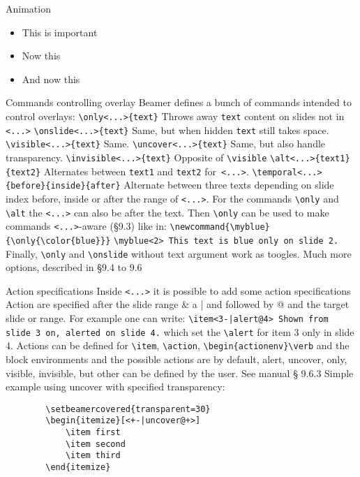 \documentclass[aspectratio=169]{beamer}
\begin{document}
	\begin{frame}{Animation}
		\begin{itemize}[<+- | alert@+>]
			\item \alert<4>{This is important}
			\item Now this
			\item And now this
		\end{itemize}
	\end{frame}

	\begin{frame}[fragile]{Commands controlling overlay}
		Beamer defines a bunch of commands intended to control overlays:
		\verb$\only<...>{text}$ Throws away \verb$text$ content on slides not in \verb$<...>$
		\verb$\onslide<...>{text}$ Same, but when hidden \verb$text$ still takes space.
		\verb$\visible<...>{text}$ Same.
		\verb$\uncover<...>{text}$ Same, but also handle transparency.
		\verb$\invisible<...>{text}$ Opposite of \verb$\visible$
		\verb$\alt<...>{text1}{text2}$ Alternates between \verb$text1$ and \verb$text2$ for\verb$ <...>$.
		\verb$\temporal<...>{before}{inside}{after}$ Alternate between three texts	depending on slide index before, inside or after the range of \verb$<...>$.
		For the commands \verb$\only$ and \verb$\alt$ the \verb$<...>$ can also be after the text.
		Then \verb$\only$ can be used to make commands \verb$<...>$-aware (§9.3) like in:
		\verb$\newcommand{\myblue}{\only{\color{blue}}}$
		\verb$\myblue<2> This text is blue only on slide 2.$
		Finally, \verb$\only$ and \verb$\onslide$ without text argument work as toogles.
		Much more options, described in §9.4 to 9.6
	\end{frame}

	\begin{frame}[fragile]{Action specifications}
		Inside \verb$<...>$ it is possible to add some action specifications
		Action are specified after the slide range \& a | and followed by @ and the target slide or range. 
		For example one can write:
		\verb$\item<3-|alert@4> Shown from slide 3 on, alerted on slide 4.$ 
		which set the \verb$\alert$ for item 3 only in slide 4.
		Actions can be defined for \verb$\item$, \verb$\action$, \verb$\begin{actionenv}\verb$
		and the block environments and the possible actions are by default,
		alert, uncover, only, visible, invisible, but other can be
		defined by the user. See manual § 9.6.3
		Simple example using uncover with specified transparency:
		\begin{verbatim}
		\setbeamercovered{transparent=30}
		\begin{itemize}[<+-|uncover@+>]
			\item first
			\item second
			\item third
		\end{itemize}
		\end{verbatim}
	\end{frame}
\end{document}
